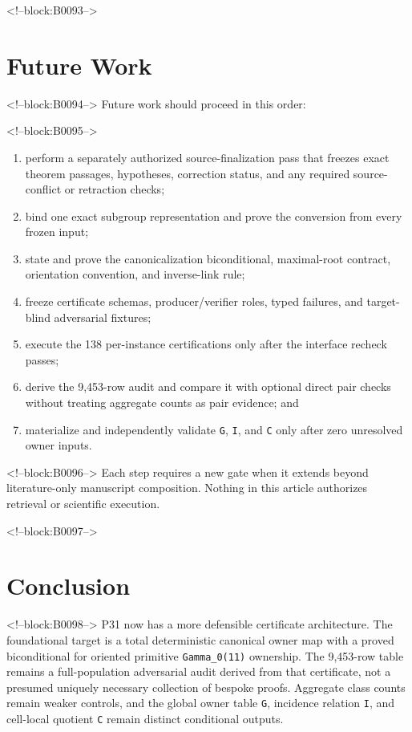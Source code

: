 \documentclass[11pt]{article}
\providecommand{\tightlist}{\setlength{\itemsep}{0pt}\setlength{\parskip}{0pt}}
\begin{document}
<!--block:B0093-->
\hypertarget{9-future-work}{%
\section{Future Work}\label{9-future-work}}

<!--block:B0094-->
Future work should proceed in this order:

<!--block:B0095-->
\begin{enumerate}
\def\labelenumi{\arabic{enumi}.}
\tightlist
\item
  perform a separately authorized source-finalization pass that freezes
  exact theorem passages, hypotheses, correction status, and any
  required source-conflict or retraction checks;
\item
  bind one exact subgroup representation and prove the conversion from
  every frozen input;
\item
  state and prove the canonicalization biconditional, maximal-root
  contract, orientation convention, and inverse-link rule;
\item
  freeze certificate schemas, producer/verifier roles, typed failures,
  and target-blind adversarial fixtures;
\item
  execute the 138 per-instance certifications only after the interface
  recheck passes;
\item
  derive the 9,453-row audit and compare it with optional direct pair
  checks without treating aggregate counts as pair evidence; and
\item
  materialize and independently validate \texttt{G}, \texttt{I}, and
  \texttt{C} only after zero unresolved owner inputs.
\end{enumerate}

<!--block:B0096-->
Each step requires a new gate when it extends beyond literature-only
manuscript composition. Nothing in this article authorizes retrieval or
scientific execution.

<!--block:B0097-->
\hypertarget{10-conclusion}{%
\section{Conclusion}\label{10-conclusion}}

<!--block:B0098-->
P31 now has a more defensible certificate architecture. The foundational
target is a total deterministic canonical owner map with a proved
biconditional for oriented primitive \texttt{Gamma\_0(11)} ownership.
The 9,453-row table remains a full-population adversarial audit derived
from that certificate, not a presumed uniquely necessary collection of
bespoke proofs. Aggregate class counts remain weaker controls, and the
global owner table \texttt{G}, incidence relation \texttt{I}, and
cell-local quotient \texttt{C} remain distinct conditional outputs.
\end{document}
